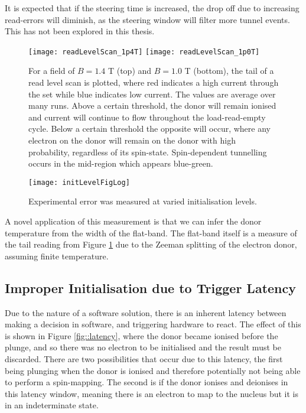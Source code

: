 	It is expected that if the steering time is increased, the drop off due to increasing read-errors will diminish, as the steering window will filter more tunnel events. This has not been explored in this thesis.
	
	\begin{figure}[htbp!]
		\flushleft
		\texttt{[image: readLevelScan\_1p4T]}
		\texttt{[image: readLevelScan\_1p0T]}
		\caption[Read level scan for two magnetic biases]{For a field of $B = 1.4$ T (top) and $B = 1.0$ T (bottom), the tail of a read level scan is plotted, where red indicates a high current through the \gls{set} while blue indicates low current. The values are average over many runs. 
		Above a certain threshold, the donor will remain ionised and current will continue to flow throughout the load-read-empty cycle. Below a certain threshold the opposite will occur, where any electron on the donor will remain on the donor with high probability, regardless of its spin-state.
		Spin-dependent tunnelling occurs in the mid-region which appears blue-green. 
		}
		\label{fig::readLevel}
	\end{figure}
	
	\begin{figure}[htbp!]
		\centering
		\texttt{[image: initLevelFigLog]}
		\caption{Experimental error was measured at varied initialisation levels.}
		\label{fig::initLevel}
	\end{figure}
	
	A novel application of this measurement is that we can infer the donor temperature from the width of the flat-band. The flat-band itself is a measure of the tail reading from Figure \ref{fig::readLevel} due to the Zeeman splitting of the electron donor, assuming finite temperature. 

\subsection{Improper Initialisation due to Trigger Latency}
	\label{sec::latency}
	Due to the nature of a software solution, there is an inherent latency between making a decision in software, and triggering hardware to react. The effect of this is shown in Figure \ref{fig::latency}, where the donor became ionised before the plunge, and so there was no electron to be initialised and the result must be discarded. There are two possibilities that occur due to this latency, the first being plunging when the donor is ionised and therefore potentially not being able to perform a spin-mapping. The second is if the donor ionises and deionises in this latency window, meaning there is an electron to map to the nucleus but it is in an indeterminate state.
	
